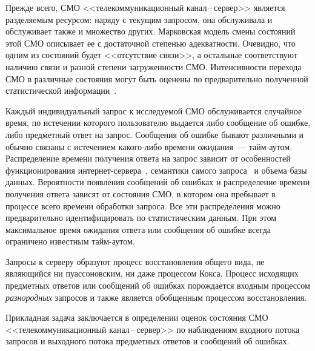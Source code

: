 \begin{multicols}{2}
 Прежде всего, СМО <<телекоммуникационный ка\-нал\,--\,сер\-вер>> является
 разделяемым ресурсом: наряду с текущим запросом, она обслуживала и обслуживает
 также и множество других. Марковская модель смены состояний этой СМО описывает
 ее с достаточной степенью адекватности. Очевидно, что одним из состояний будет
 <<отсутствие связи>>, а остальные соответствуют наличию связи и разной степени
 загруженности СМО. Интенсивности перехода СМО в различные со\-сто\-яния могут быть
 оценены по предварительно полученной статистической информации~\cite{IvKK_82, KR_88}.

 Каждый индивидуальный запрос к исследуемой СМО обслуживается случайное время, по
 истечении которого пользователю выдается либо сообщение об ошибке, либо предметный
 ответ на запрос.  Сообщения об ошибке бывают различными и обычно связаны с
 истечением ка\-ко\-го-ли\-бо времени ожидания~--- тайм-аутом. Распределение времени
 получения ответа на запрос зависит от особенностей функционирования
 ин\-тер\-нет-сер\-ве\-ра~\cite {ONA_04}, семантики самого запроса~\cite{OV_11}
 и объема базы данных. Вероятности появления сообщений об ошибках и распределение
 времени получения ответа зависят от состояния СМО, в котором она пребывает в
 процессе всего времени обработки запроса. Все эти распределения можно
 предварительно идентифицировать по статистическим данным. При этом
 максимальное время ожидания ответа или сообщения об ошибке всегда
 ограничено известным тайм-аутом.

 Запросы к серверу образуют процесс вос\-ста\-нов\-ле\-ния общего вида, не
 являющийся ни пуассо\-новским, ни даже процессом Кокса. Процесс исходящих
 предметных ответов или сообщений об ошибках порождается входным процессом
 {\it разнородных} запросов и также является обобщенным процессом восстановления.

 Прикладная задача заключается в определении оценок состояния СМО
 <<телекоммуникационный ка\-нал\,--\,сер\-вер>> по наблюдениям входного
 потока запросов и выходного потока предметных ответов и сообщений об ошибках.


\end{multicols}
